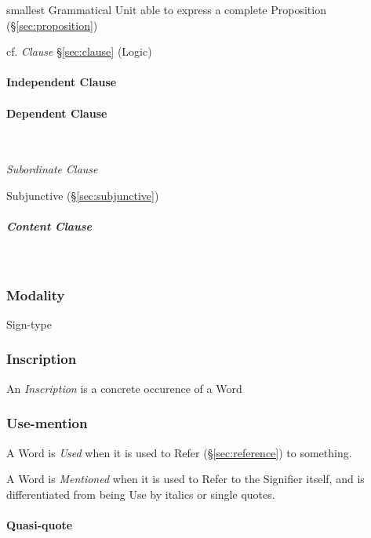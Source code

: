 smallest Grammatical Unit able to express a complete Proposition
(\S\ref{sec:proposition})

cf. \emph{Clause} \S\ref{sec:clause} (Logic)



\paragraph{Independent Clause}\label{sec:independent_clause}\hfill

\paragraph{Dependent Clause}\label{sec:dependent_clause}\hfill \\\hfill

\emph{Subordinate Clause}

Subjunctive (\S\ref{sec:subjunctive})

\subparagraph{Content Clause}\label{sec:content_clause}\hfill \\\hfill



\subsubsection{Modality}\label{sec:syntax_modality}

Sign-type




\subsubsection{Inscription}\label{sec:inscription}

An \emph{Inscription} is a concrete occurence of a Word



\subsubsection{Use-mention}\label{sec:use_mention}

A Word is \emph{Used} when it is used to Refer (\S\ref{sec:reference})
to something.

A Word is \emph{Mentioned} when it is used to Refer to the Signifier
itself, and is differentiated from being Use by italics or single
quotes.



\paragraph{Quasi-quote}\label{sec:quasi_quote}\hfill

